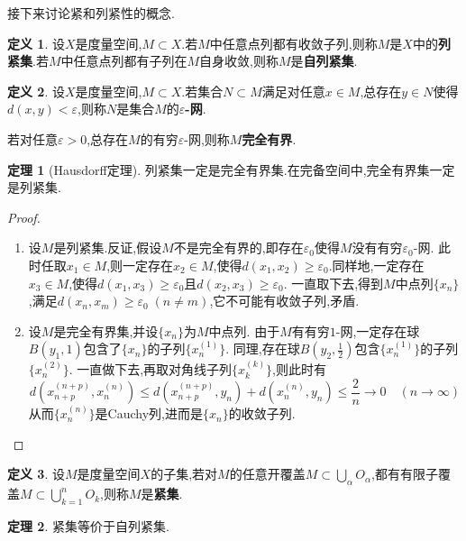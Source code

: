 \documentclass{ctexart}
\theoremstyle{definition}
\newtheorem{definition}{定义}
\newtheorem{theorem}{定理}
\theoremstyle{remark}
\begin{document}
	接下来讨论紧和列紧性的概念.
	\begin{definition}
		设$X$是度量空间,$M\subset X$.若$M$中任意点列都有收敛子列,则称$M$是$X$中的\textbf{列紧集}.若$M$中任意点列都有子列在$M$自身收敛,则称$M$是\textbf{自列紧集}.
	\end{definition}
	\begin{definition}
		设$X$是度量空间,$M\subset X$.若集合$N\subset M$满足对任意$x\in M$,总存在$y\in N$使得$d(x,y)<\varepsilon$,则称$N$是集合$M$的\textbf{$\varepsilon$-网}.
		
		若对任意$\varepsilon>0$,总存在$M$的有穷$\varepsilon$-网,则称$M$\textbf{完全有界}.
	\end{definition}
	\begin{theorem}[Hausdorff定理]
		列紧集一定是完全有界集.在完备空间中,完全有界集一定是列紧集.
	\end{theorem}
	\begin{proof}
		\begin{enumerate}
			\item 设$M$是列紧集.反证,假设$M$不是完全有界的,即存在$\varepsilon_0$使得$M$没有有穷$\varepsilon_0$-网.
			此时任取$x_1\in M$,则一定存在$x_2\in M$,使得$d(x_1,x_2)\ge\varepsilon_0$.同样地,一定存在$x_3\in M$,使得$d(x_1,x_3)\ge\varepsilon_0$且$d(x_2,x_3)\ge\varepsilon_0$.
			一直取下去,得到$M$中点列$\{x_n\}$,满足$d(x_n,x_m)\ge\varepsilon_0\;(n\ne m)$,它不可能有收敛子列,矛盾.
			
			\item 设$M$是完全有界集,并设$\{x_n\}$为$M$中点列.
			由于$M$有有穷$1$-网,一定存在球$B(y_1,1)$包含了$\{x_n\}$的子列$\{x_n^{(1)}\}$.
			同理,存在球$B(y_2,\frac{1}{2})$包含$\{x_n^{(1)}\}$的子列$\{x_n^{(2)}\}$.
			一直做下去,再取对角线子列$\{x_k^{(k)}\}$,则此时有
			$$d(x_{n+p}^{(n+p)},x_n^{(n)})\le d(x_{n+p}^{(n+p)},y_n)+d(x_n^{(n)},y_n)\le\frac{2}{n}\to 0\quad(n\to\infty)$$
			从而$\{x_n^{(n)}\}$是Cauchy列,进而是$\{x_n\}$的收敛子列.
		\end{enumerate}
	\end{proof}
	\begin{definition}
		设$M$是度量空间$X$的子集,若对$M$的任意开覆盖$M\subset\bigcup_{\alpha}{O_\alpha}$,都有有限子覆盖$M\subset\bigcup_{k=1}^n{O_k}$,则称$M$是\textbf{紧集}.
	\end{definition}
	\begin{theorem}
		紧集等价于自列紧集.
	\end{theorem}
\end{document}
